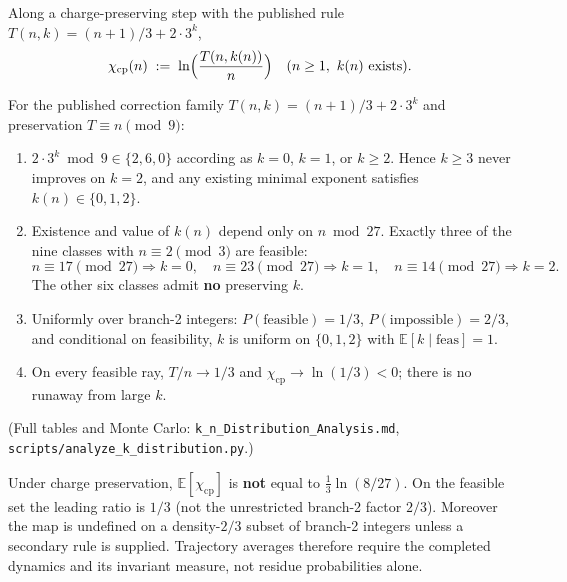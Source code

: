 \begin{definition}
\label{def:chi-cp}
Along a charge-preserving step with the published rule
\(T(n,k)=(n+1)/3+2\cdot 3^{k}\),
\begin{equation}
\label{eq:chi-cp}
\chi_{\mathrm{cp}}(n)
\;:=\;
\ln\Bigl(\frac{T(n,k(n))}{n}\Bigr)
\quad(n\ge 1,\ k(n)\ \text{exists}).
\end{equation}
\end{definition}

\begin{theorem}[Distribution of \(k(n)\) under \(Q=n\bmod 9\)]
\label{thm:k-dist}
For the published correction family \(T(n,k)=(n+1)/3+2\cdot 3^{k}\) and
preservation \(T\equiv n\pmod{9}\):
\begin{enumerate}[label=(\roman*)]
  \item \(2\cdot 3^{k}\bmod 9\in\{2,6,0\}\) according as \(k=0\), \(k=1\), or
        \(k\ge 2\). Hence \(k\ge 3\) never improves on \(k=2\), and any existing
        minimal exponent satisfies \(k(n)\in\{0,1,2\}\).
  \item Existence and value of \(k(n)\) depend only on \(n\bmod 27\). Exactly
        three of the nine classes with \(n\equiv 2\pmod{3}\) are feasible:
        \[
        n\equiv 17\pmod{27}\Rightarrow k=0,\quad
        n\equiv 23\pmod{27}\Rightarrow k=1,\quad
        n\equiv 14\pmod{27}\Rightarrow k=2.
        \]
        The other six classes admit \textbf{no} preserving \(k\).
  \item Uniformly over branch-2 integers:
        \(P(\mathrm{feasible})=1/3\), \(P(\mathrm{impossible})=2/3\), and
        conditional on feasibility, \(k\) is uniform on \(\{0,1,2\}\) with
        \(\mathbb{E}[k\mid\mathrm{feas}]=1\).
  \item On every feasible ray, \(T/n\to 1/3\) and
        \(\chi_{\mathrm{cp}}\to\ln(1/3)<0\); there is no runaway from large \(k\).
\end{enumerate}
(Full tables and Monte Carlo: \texttt{k\_n\_Distribution\_Analysis.md},
\texttt{scripts/analyze\_k\_distribution.py}.)
\end{theorem}

\begin{lemma}
\label{lem:not-residue}
Under charge preservation, \(\mathbb{E}[\chi_{\mathrm{cp}}]\) is \textbf{not}
equal to \(\frac13\ln(8/27)\). On the feasible set the leading ratio is
\(1/3\) (not the unrestricted branch-2 factor \(2/3\)). Moreover the map is
undefined on a density-\(2/3\) subset of branch-2 integers unless a secondary
rule is supplied. Trajectory averages therefore require the completed dynamics
and its invariant measure, not residue probabilities alone.
\end{lemma}

